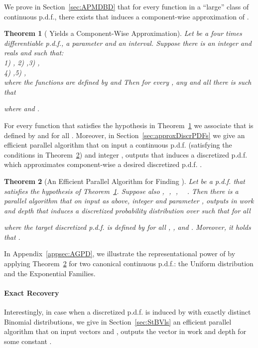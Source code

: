 \documentclass[11pt]{article}
\newtheorem{thm}{Theorem}  \newtheorem{fact}[thm]{Fact}
\numberwithin{thm}{section}
\begin{document}
We prove in Section~\ref{sec:APMDBD} that for every function  in a ``large'' class of continuous p.d.f., there exists  that induces a component-wise approximation of .


\begin{thm}[ Yields a Component-Wise Approximation]\label{thmMDBD}
Let  be a four times differentiable p.d.f.,  a parameter and  an interval. Suppose there is an integer  and reals  and  such that:\\
1) , 2) ,3) ,\\
4)  ,5) ,\\
where the functions  are defined by 
and 
Then for every , any  and all  there is  such that

where  and .
\end{thm}

For every function  that satisfies the hypothesis in Theorem~\ref{thmMDBD} we associate   that is defined by  and  for all . Moreover, in Section~\ref{sec:approxDiscrPDFs} we give an efficient parallel algorithm that on input a continuous p.d.f.  (satisfying the conditions in Theorem~\ref{thm_AppDscrPDF}) and integer , outputs  that induces a discretized p.d.f. which approximates component-wise a desired discretized p.d.f. .

\begin{thm}[An Efficient Parallel Algorithm for Finding ]\label{thm_AppDscrPDF}
Let  be a p.d.f. that satisfies the hypothesis of Theorem~\ref{thmMDBD}. Suppose also ,\,\,\,\,,\,\,\,\,,\,\,\,\,\,\,\,\,. Then there is a parallel algorithm  that on input  as above, integer  and parameter , outputs in  work and  depth   that induces a discretized probability distribution  over  such that for all 

where the target discretized p.d.f. is defined by  for all , ,  and . Moreover, it holds that .
\end{thm}

In Appendix~\ref{appsec:AGPD}, we illustrate the representational power of  by applying Theorem~\ref{thm_AppDscrPDF} for two canonical continuous p.d.f.: the Uniform distribution and the Exponential Families.

\paragraph*{Exact Recovery}
Interestingly, in case when a discretized p.d.f.  is induced by   with exactly  distinct Binomial distributions, we give in Section~\ref{sec:StBVls} an efficient parallel algorithm that on input vectors  and , outputs the vector  in  work and  depth for some constant .
\end{document}
